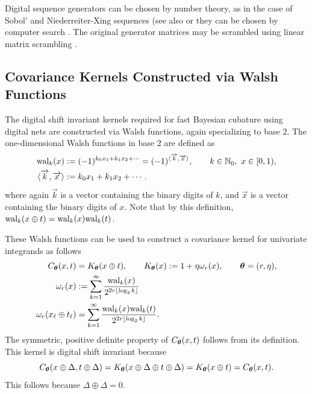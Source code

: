 \documentclass[graybox,footinfo]{svmult}
\begin{document}
Digital sequence generators can be chosen by number theory, as in the case of Sobol' \cite{Sob67} and Niederreiter-Xing sequences \cite{NieXin01a} (see also \cite[Chapter 8]{DicPil10a} or they can be chosen by computer search \cite[Chapter 10]{DicPil10a}.  The original generator matrices may be scrambled using linear matrix scrambling \cite{Mat98}.


\subsection{Covariance Kernels Constructed via Walsh Functions} \label{FJ:sec:Walsh_kernels}

The digital shift invariant kernels required for fast Bayesian cubature using digital nets are constructed via Walsh functions, again specializing to base $2$. 
The one-dimensional Walsh functions in base $2$ are defined as
\begin{align}
    \label{FJ:eqn:walsh_func}
\textup{wal}_{k}(x) & := (-1)^{k_0 x_1 + k_1 x_2 + \cdots} = (-1)^{\langle \overrightarrow{k}, \overrightarrow{x} \rangle},  \qquad k \in {\N}_0, \ x \in [0,1), \\
\nonumber
\langle \overrightarrow{k}, \overrightarrow{x} \rangle & : = k_{0} x_{1} + k_{1} x_{2} + \cdots .
\end{align}
where again $\overrightarrow{k}$ is a vector containing the binary digits of $k$, and $\overrightarrow{x}$ is a vector containing the binary digits of $x$.  Note that by this definition, $\textup{wal}_{k}(x \oplus t) =  \textup{wal}_{k}(x) \textup{wal}_{k}(t)$.  

These Walsh functions can be used to construct a covariance kernel for univariate integrands as follows
\begin{align*}
    C_{\boldsymbol{\theta}} (x,t) & = K_{\boldsymbol{\theta}}(x \oplus t), \qquad K_{\boldsymbol{\theta}}(x) : = 1 + \eta \omega_{r} (x), \qquad {\boldsymbol{\theta}} = (r,\eta), \\
    \omega_r(x) & := \sum_{k=1}^\infty \frac{\textup{wal}_{k}(x) }{2^{2r \lfloor \log_2 k \rfloor}} \\
    \omega_{r} (x_\ell \oplus t_\ell) & = \sum_{k=1}^\infty \frac{\textup{wal}_{k}(x) \textup{wal}_{k}(t)  }{2^{2r \lfloor \log_2 k \rfloor}}.
\end{align*}
The symmetric, positive definite property of $ C_{\boldsymbol{\theta}} (x,t)$ follows from its definition.  This kernel is digital shift invariant because 
\[
C_{\boldsymbol{\theta}} (x \oplus \Delta ,t \oplus \Delta ) = K_{\boldsymbol{\theta}}(x \oplus \Delta \oplus t \oplus \Delta) = K_{\boldsymbol{\theta}}(x \oplus t) =  C_{\boldsymbol{\theta}} (x,t).
\]
This follows because $\Delta \oplus \Delta = 0$.
\end{document}

